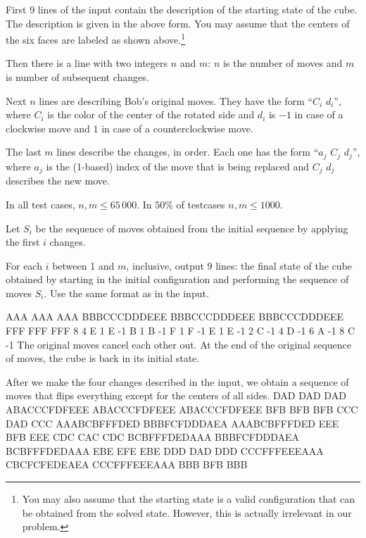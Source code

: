 
First 9 lines of the input contain the description of
the starting state of the cube. The description is given
in the above form. You may assume that the centers of the 
six faces are labeled as shown above.\footnote{You may also assume
that the starting state is a valid configuration that can be obtained
from the solved state. However, this is actually irrelevant in our problem.}

Then there is a line with two integers $n$ and $m$:
$n$ is the number of moves and $m$ is number of subsequent changes.

Next $n$ lines are describing Bob's original moves.
They have the form ``$C_i$ $d_i$'',
where $C_i$ is the color of the center of the rotated side
and $d_i$ is $-1$ in case of a clockwise move
and $1$ in case of a counterclockwise move.

The last $m$ lines describe the changes, in order.
Each one has the form ``$a_j$ $C_j$ $d_j$'',
where $a_j$ is the (1-based) index of the move that
is being replaced and $C_j$ $d_j$ describes the 
new move.


In all test cases, $n,m \leq 65\,000$. In $50\%$ of testcases $n,m \leq 1000$.

\newpage


Let $S_i$ be the sequence of moves obtained from the initial sequence
by applying the first $i$ changes.

For each $i$ between 1 and $m$, inclusive, output 9 lines: the final state 
of the cube obtained by starting in the initial configuration and performing
the sequence of moves $S_i$. Use the same format as in the input.


\sampleIN
AAA
AAA
AAA
BBBCCCDDDEEE
BBBCCCDDDEEE
BBBCCCDDDEEE
FFF
FFF
FFF
8 4
E 1
E -1
B 1
B -1
F 1
F -1
E 1
E -1
2 C -1
4 D -1
6 A -1
8 C -1
\sampleCOMMENT
The original moves cancel each other out.
At the end of the original sequence of moves,
the cube is back in its initial state.

After we make the four changes described in the input,
we obtain a sequence of moves that flips everything
except for the centers of all sides.
\sampleOUT
DAD
DAD
DAD
ABACCCFDFEEE
ABACCCFDFEEE
ABACCCFDFEEE
BFB
BFB
BFB
CCC
DAD
CCC
AAABCBFFFDED
BBBFCFDDDAEA
AAABCBFFFDED
EEE
BFB
EEE
CDC
CAC
CDC
BCBFFFDEDAAA
BBBFCFDDDAEA
BCBFFFDEDAAA
EBE
EFE
EBE
DDD
DAD
DDD
CCCFFFEEEAAA
CBCFCFEDEAEA
CCCFFFEEEAAA
BBB
BFB
BBB
\sampleEND



